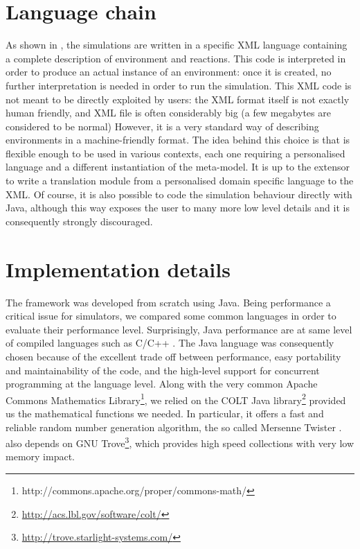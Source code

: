 \documentclass[12pt,a4paper,twoside,openright]{book}
\begin{document}
\section{Language chain}

As shown in , the simulations are written in a specific XML language containing a complete description of environment and reactions.
%
This code is interpreted in order to produce an actual instance of an environment: once it is created, no further interpretation is needed in order to run the simulation.
%
This XML code is not meant to be directly exploited by users: the XML format itself is not exactly human friendly, and XML file is often considerably big (a few megabytes are considered to be normal)
%
However, it is a very standard way of describing environments in a machine-friendly format.
%
The idea behind this choice is that \alchemist{} is flexible enough to be used in various contexts, each one requiring a personalised language and a different instantiation of the meta-model.
%
It is up to the extensor to write a translation module from a personalised domain specific language to the \alchemist{} XML.
%
Of course, it is also possible to code the simulation behaviour directly with Java, although this way exposes the user to many more low level details and it is consequently strongly discouraged.

\section{Implementation details}

The framework was developed from scratch using Java. Being performance a critical issue for simulators, we compared some common languages in order to evaluate their performance level.
%
Surprisingly, Java performance are at same level of compiled languages such as C/C++ \cite{bull2003, oancea2011}.
%
The Java language was consequently chosen because of the excellent trade off between performance, easy portability and maintainability of the code, and the high-level support for concurrent programming at the language level. 
%
Along with the very common Apache Commons Mathematics Library\footnote{http://commons.apache.org/proper/commons-math/}, we relied on the COLT Java library\footnote{\url{http://acs.lbl.gov/software/colt/}} provided us the mathematical functions we needed.
%
In particular, it offers a fast and reliable random number generation algorithm, the so called Mersenne Twister \cite{matsumoto1998}.
%
\alchemist{} also depends on GNU Trove\footnote{\url{http://trove.starlight-systems.com/}}, which provides high speed collections with very low memory impact.
\end{document}
